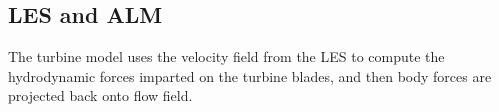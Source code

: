\documentclass[xcolor=x11names,compress]{beamer}
\renewcommand{\(}{\begin{columns}}
\renewcommand{\)}{\end{columns}}
\newcommand{\<}[1]{\begin{column}{#1}}
\renewcommand{\>}{\end{column}}
\begin{document}
\subsection{LES and ALM}
\begin{frame}{}


\small The turbine model uses the 
velocity field from the LES to compute the 
hydrodynamic forces imparted on the turbine blades, and
then body forces are projected back onto flow field. \footnotemark

\vspace{-5pt}

\begin{columns}
		    
    \begin{column}{0.3\textwidth}

\vspace{-10pt}


\end{column}
\end{columns}
\end{frame}
\end{document}
